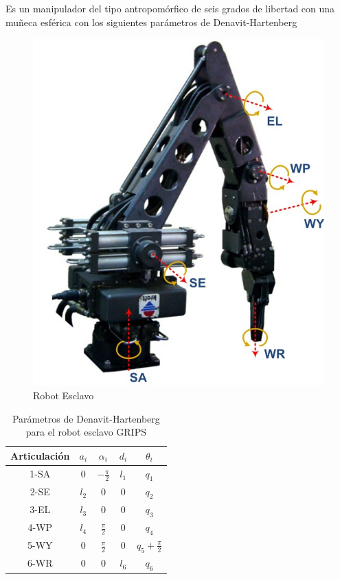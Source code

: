 Es un manipulador del tipo antropomórfico de seis grados de libertad con una muñeca esférica con los siguientes parámetros de Denavit-Hartenberg

\begin{figure}[htb!]
\centering
\includegraphics[scale=0.45]{FiguresP/EsclavoKraft}
\caption{Robot Esclavo }
\label{Esclavo}
\end{figure}



\begin{table}[htb!]
\caption{Parámetros de Denavit-Hartenberg para el robot esclavo GRIPS}
\centering
\label{tab:dhslave}
\begin{tabular}{ c c c c c }
 \hline
 Articulación & $a_i$ & $\alpha_i$ & $d_i$ & $\theta_i$ \\
 \hline
 1-SA 			& 0      & $-\frac{\pi}{2}$  & $l_1$     & $q_1$\\
 2-SE 			& $l_2$	 & 0                 & 0     & $q_2$\\
 3-EL 			& $l_3$	 & 0				    & 0     & $q_3$\\
 4-WP 			& $l_4$  & $\frac{\pi}{2}$   & 0     & $q_4$\\
 5-WY 			& 0      & $\frac{\pi}{2}$   & 0     & $q_5+\frac{\pi}{2}$\\
 6-WR 			& 0		 & 0                 & $l_6$     & $q_6$\\
 \hline
\end{tabular}
\end{table}



